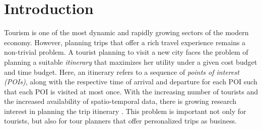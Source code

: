 \section{Introduction}

Tourism is one of the most dynamic and rapidly growing sectors of the modern
economy. However, planning trips that offer a rich travel experience remains a
non-trivial problem. A tourist planning to visit a new city faces the problem of
planning a suitable \emph{itinerary} that maximizes her utility under a given
cost budget and time budget. Here, an itinerary refers to a sequence of
\emph{points of interest (POIs)}, along with the respective time of arrival and
departure for each POI such that each POI is visited at most once. With the
increasing number of tourists and the increased availability of spatio-temporal
data, there is growing research interest in planning the trip itinerary
\cite{li2016travel, gavalas2014survey, sylejmani2011survey}. This problem is
important not only for tourists, but also for tour planners that offer
personalized trips as business.

